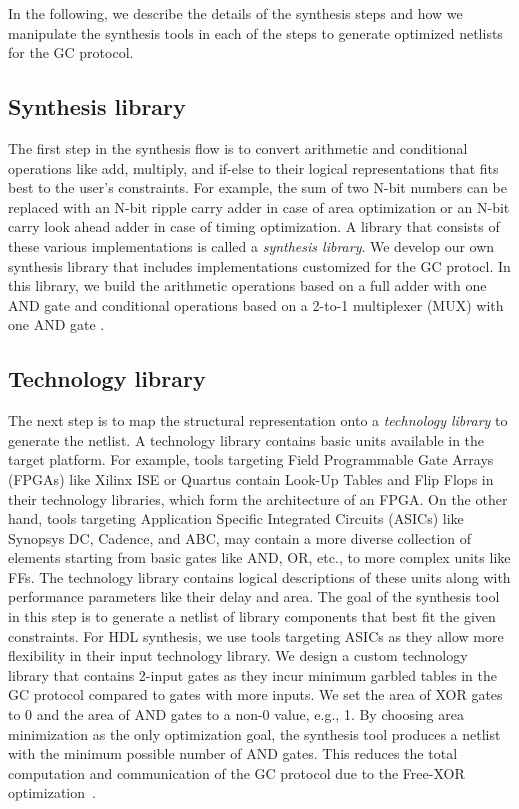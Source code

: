 In the following, we describe the details of the synthesis steps and how we manipulate the synthesis tools in each of the steps to generate optimized netlists for the GC protocol.

\subsection{Synthesis library}
The first step in the synthesis flow is to convert arithmetic and conditional operations like add, multiply, and if-else to their logical representations that fits best to the user's constraints.
For example, the sum of two N-bit numbers can be replaced with an N-bit ripple carry adder in case of area optimization or an N-bit carry look ahead adder in case of timing optimization.
A library that consists of these various implementations is called a \emph{synthesis library}.
We develop our own synthesis library that includes implementations customized for the GC protocl.
In this library, we build the arithmetic operations based on a full adder with one AND gate \cite{boyar2006concrete} and conditional operations based on a 2-to-1 multiplexer (MUX) with one AND gate \cite{kolesnikov2008improved}.

\subsection{Technology library}\label{sect:syn-tech}
The next step is to map the structural representation onto a \emph{technology library} to generate the netlist.
A technology library contains basic units available in the target platform.
For example, tools targeting Field Programmable Gate Arrays (FPGAs) like Xilinx ISE or Quartus contain Look-Up Tables and Flip Flops in their technology libraries, which form the architecture of an FPGA.
On the other hand, tools targeting Application Specific Integrated Circuits (ASICs) like Synopsys DC, Cadence, and ABC, may contain a more diverse collection of elements starting from basic gates like AND, OR, etc., to more complex units like FFs.
The technology library contains logical descriptions of these units along with performance parameters like their delay and area.
The goal of the synthesis tool in this step is to generate a netlist of library components that best fit the given constraints.
For HDL synthesis, we use tools targeting ASICs as they allow more flexibility in their input technology library.
We design a custom technology library that contains 2-input gates as they incur minimum garbled tables in the GC protocol compared to gates with more inputs.
We set the area of XOR gates to 0 and the area of AND gates to a non-0 value, e.g., 1.
By choosing area minimization as the only optimization goal, the synthesis tool produces a netlist with the minimum possible number of AND gates.
This reduces the total computation and communication of the GC protocol due to the Free-XOR optimization~\cite{kolesnikov2008improved}.

